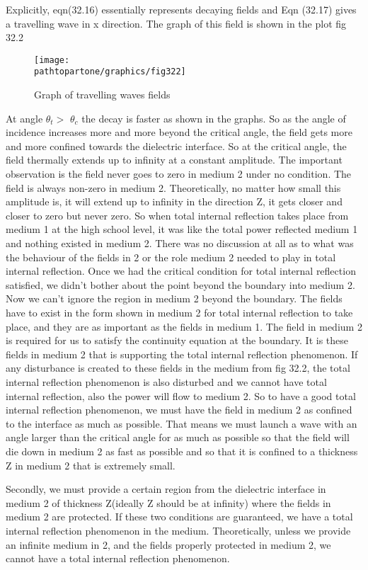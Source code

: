 Explicitly, eqn(32.16) essentially represents decaying fields and Eqn (32.17) gives a travelling wave in x direction. The graph of this field is shown in the plot fig 32.2
\begin{figure}[h]
\centering
\texttt{[image: \\pathtopartone/graphics/fig322]}
\caption{Graph of travelling waves fields}
\end{figure}

At angle $\theta_t >$ $\theta_c$ the decay is faster as shown in the graphs. 
So as the angle of incidence increases more and more beyond the critical angle, the field gets more and more confined towards the dielectric interface. So at the critical angle, the field thermally extends up to infinity at a constant amplitude. The important observation is the field never goes to zero in medium 2 under no condition. The field is always non-zero in medium 2. Theoretically, no matter how small this amplitude is, it will extend up to infinity in the direction Z, it gets closer and closer to zero but never zero.
So when total internal reflection takes place from medium 1 at the high school level, it was like the total power reflected medium 1 and nothing existed in medium 2. There was no discussion at all as to what was the behaviour of the fields in 2 or the role medium 2 needed to play in total internal reflection. Once we had the critical condition for total internal reflection satisfied, we didn't bother about the point beyond the boundary into medium 2. Now we can't ignore the region in medium 2 beyond the boundary. The fields have to exist in the form shown in medium 2 for total internal reflection to take place, and they are as important as the fields in medium 1. The field in medium 2 is required for us to satisfy the continuity equation at the boundary. It is these fields in medium 2 that is supporting the total internal reflection phenomenon. If any disturbance is created to these fields in the medium from fig 32.2, the total internal reflection phenomenon is also disturbed and we cannot have total internal reflection, also the power will flow to medium 2. So to have a good total internal reflection phenomenon, we must have the field in medium 2 as confined to the interface as much as possible. That means we must launch a wave with an angle larger than the critical angle for as much as possible so that the field will die down in medium 2 as fast as possible and so that it is confined to a thickness Z in medium 2 that is extremely small.

Secondly, we must provide a certain region from the dielectric interface in medium 2 of thickness Z(ideally Z should be at infinity) where the fields in medium 2 are protected. If these two conditions are guaranteed, we have a total internal reflection phenomenon in the medium. Theoretically, unless we provide an infinite medium in 2, and the fields properly protected in medium 2, we cannot have a total internal reflection phenomenon.

